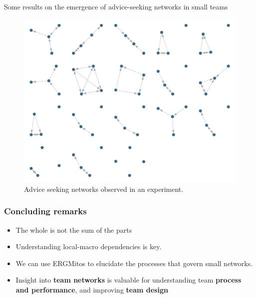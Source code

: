 \documentclass[aspectratio=169, 9pt]{beamer}\usepackage[]{graphicx}\usepackage[]{color}
\begin{document}
\begin{frame}[label=examples]

Some results on the emergence of advice-seeking networks in small teams

\vspace{.5cm}

\begin{minipage}{.44\linewidth}
\end{minipage}
\hfill
\begin{minipage}{.55\linewidth}
\begin{figure}
\centering
\includegraphics[width = .95\linewidth]{fig/plot-graph-4-1.pdf}
\caption{Advice seeking networks observed in an experiment.}
\end{figure}
\end{minipage}
\end{frame}

\begin{frame}
\frametitle{Concluding remarks}

\begin{itemize}[<+->]
\item The whole is not the sum of the parts
\item Understanding local-macro dependencies is key.
\item We can use ERGMitos to elucidate the processes that govern small networks.
\item Insight into \textbf{team networks} is valuable for understanding team \textbf{process and performance}, and improving \textbf{team design}
\end{itemize}

\end{frame}
\end{document}

